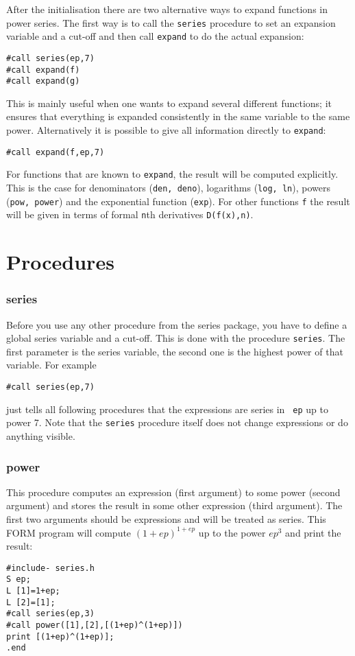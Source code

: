 \documentclass{article}
\begin{document}
After the initialisation there are two alternative ways to expand
functions in power series. The first way is to call the {\tt series}
procedure to set an expansion variable and a cut-off and then call 
{\tt expand} to do the actual expansion:
\begin{verbatim}
#call series(ep,7)
#call expand(f)
#call expand(g)
\end{verbatim}
This is mainly useful when one wants to expand several different functions; it
ensures that everything is expanded consistently in the same variable to
the same power. Alternatively it is possible to give all information
directly to {\tt expand}: 
\begin{verbatim}
#call expand(f,ep,7)
\end{verbatim}

For functions that are known to {\tt expand}, the result will be
computed explicitly. This is the case for denominators ({\tt den,
  deno}), logarithms ({\tt log, ln}), powers ({\tt pow, power}) and the
exponential function ({\tt exp}). For other functions {\tt f} the result
will be given in terms of formal {\tt n}th derivatives {\tt D(f(x),n)}.

\section{Procedures}
\label{sec:proc}


\subsubsection{series}
\label{sec:series}

Before you use any other procedure from the series package, you have to
define a global series variable and a cut-off. This is done with the
procedure {\tt series}. The first parameter is the series variable, the
second one is the highest power of that variable. For example
\begin{verbatim}
#call series(ep,7)
\end{verbatim}
just tells all following procedures that the expressions are series in {\tt
  ep} up to power 7. Note that the {\tt series} procedure itself does
not change expressions or do anything visible.

\subsubsection{power}
\label{sec:pow}

This procedure computes an expression (first argument) to some power
(second argument) and stores the result in some other expression (third
argument). The first two arguments should be expressions and will be
treated as series. This FORM program will compute $(1+ep)^{1+ep}$ up to
the power $ep^3$ and print the result:
\begin{verbatim}
#include- series.h
S ep;
L [1]=1+ep;
L [2]=[1];
#call series(ep,3)
#call power([1],[2],[(1+ep)^(1+ep)])
print [(1+ep)^(1+ep)];
.end
\end{verbatim}
\end{document}
